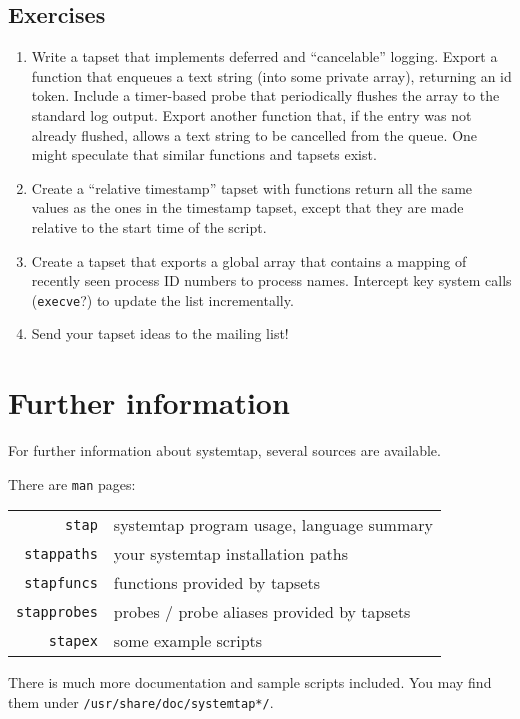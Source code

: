 \documentclass{article}
\begin{document}
\subsection{Exercises}

\begin{enumerate}
\item Write a tapset that implements deferred and ``cancelable''
logging.  Export a function that enqueues a text string (into some
private array), returning an id token.  Include a timer-based probe
that periodically flushes the array to the standard log output.
Export another function that, if the entry was not already flushed,
allows a text string to be cancelled from the queue.
One might speculate that similar functions and tapsets exist.

\item Create a ``relative timestamp'' tapset with functions return all
the same values as the ones in the timestamp tapset, except that they
are made relative to the start time of the script.

\item Create a tapset that exports a global array that contains a
mapping of recently seen process ID numbers to process names.
Intercept key system calls (\verb+execve+?) to update the list
incrementally.

\item Send your tapset ideas to the mailing list!
\end{enumerate}

\section{Further information}

For further information about systemtap, several sources are available.

There are \verb+man+ pages:

\begin{tabular}{rl}
\verb+stap+ & systemtap program usage, language summary \\
\verb+stappaths+ & your systemtap installation paths \\
\verb+stapfuncs+ & functions provided by tapsets \\
\verb+stapprobes+ & probes / probe aliases provided by tapsets \\
\verb+stapex+ & some example scripts \\
\end{tabular}

There is much more documentation and sample scripts included.  You
may find them under \verb+/usr/share/doc/systemtap*/+.
\end{document}
